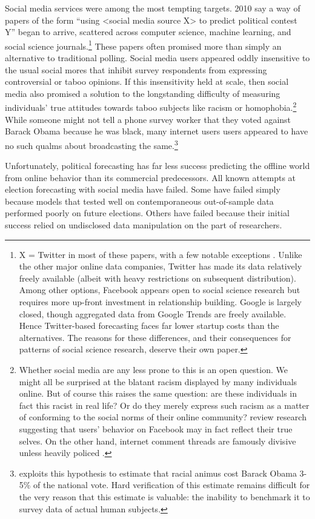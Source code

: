 \documentclass{article}
\begin{document}
Social media services were among the most tempting
targets. 2010 say a way of papers of the form ``using
<social media source X> to predict political contest Y'' began to
arrive, scattered across computer science, machine learning, and
social science journals.\footnote{X = Twitter in most of these papers, with a few notable
  exceptions \citep{bond201261,broockman2013online}. Unlike the other major online data companies, Twitter has made
  its data relatively freely available (albeit with heavy restrictions
  on subsequent distribution). Among other options, Facebook appears open to
  social science research but requires more up-front investment in
  relationship building. Google is largely closed, though aggregated
  data from Google Trends are freely available. Hence Twitter-based
  forecasting faces far lower startup costs than the alternatives. The reasons for these
  differences, and their consequences for patterns of social science
  research, deserve their own paper.}
These papers often promised more than simply an
alternative to traditional polling. Social media users appeared oddly
insensitive to the usual social mores that inhibit survey respondents from expressing
controversial or taboo opinions. If this insensitivity held at scale, then social
media also promised a solution to the longstanding
difficulty of measuring individuals' true attitudes towards taboo
subjects like racism or homophobia.\footnote{Whether social media are any less prone to this
is an open question. We might all be surprised at the blatant racism
displayed by many individuals online. But of course this raises the
same question: are these individuals in fact this racist in real life?
Or do they merely express such racism as a matter of conforming to the
social norms of their online community? \cite{wilson2012review}
review research suggesting that users' behavior on Facebook may in
fact reflect their true selves. On the other hand, internet comment
threads are famously divisive unless heavily policed \citep{binns2012don}.}  While someone might not tell a phone survey worker that they
voted against Barack Obama because he was black, many internet users
users appeared to have no such qualms about broadcasting the
same.\footnote{\cite{stephens2013cost} exploits this hypothesis to
  estimate that racial animus cost Barack Obama 3-5\% of the national
  vote. Hard verification of this estimate remains difficult for the
  very reason that this estimate is valuable: the inability to
  benchmark it to survey data of actual human subjects.}

Unfortunately, political forecasting has far less success predicting
the offline world from online behavior than its commercial
predecessors. All known attempts at election forecasting with social
media have failed. Some have failed simply because models that tested
well on contemporaneous out-of-sample data performed poorly on future
elections. Others have failed because their initial success relied on
undisclosed data manipulation on the part of researchers.
\end{document}
